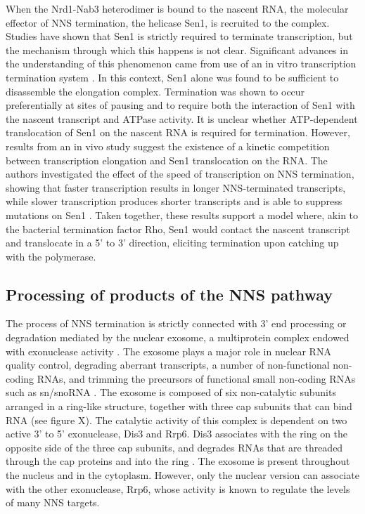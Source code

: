 When the Nrd1-Nab3 heterodimer is bound to the nascent RNA, the molecular effector of NNS termination, the helicase Sen1, is recruited to the complex. 
Studies have shown that Sen1 is strictly required to terminate transcription, but the mechanism through which this happens is not clear. 
Significant advances in the understanding of this phenomenon came from use of an in vitro transcription termination system \cite{porrua:2013:bacteriallike}. 
In this context, Sen1 alone was found to be sufficient to disassemble the elongation complex. Termination was shown to occur preferentially at sites of pausing and to require both the interaction of Sen1 with the nascent transcript and ATPase activity. 
It is unclear whether ATP-dependent translocation of Sen1 on the nascent RNA is required for termination. However, results from an in vivo study suggest the existence of a kinetic competition between transcription elongation and Sen1 translocation on the RNA. 
The authors investigated the effect of the speed of transcription on NNS termination, showing that faster transcription results in longer NNS-terminated transcripts, while slower transcription produces shorter transcripts and is able to suppress mutations on Sen1 \cite{hazelbaker:2013:kinetic}. 
Taken together, these results support a model where, akin to the bacterial termination factor Rho, Sen1 would contact the nascent transcript and translocate in a 5’ to 3’ direction, eliciting termination upon catching up with the polymerase.

\subsection{Processing of products of the NNS pathway}

The process of NNS termination is strictly connected with 3' end processing or degradation mediated by the nuclear exosome, a multiprotein complex endowed with exonuclease activity \cite{vasiljeva:2006:nrd1}. 
The exosome plays a major role in nuclear RNA quality control, degrading aberrant transcripts, a number of non-functional non-coding RNAs, and trimming the precursors of functional small non-coding RNAs such as sn/snoRNA \cite[for review see][]{kilchert:2016:regulation}. 
The exosome is composed of six non-catalytic subunits arranged in a ring-like structure, together with three cap subunits that can bind RNA (see figure X). 
The catalytic activity of this complex is dependent on two active 3' to 5' exonuclease, Dis3 and Rrp6. 
Dis3 associates with the ring on the opposite side of the three cap subunits, and degrades RNAs that are threaded through the cap proteins and into the ring \cite{makino:2015:rna}. 
The exosome is present throughout the nucleus and in the cytoplasm. 
However, only the nuclear version can associate with the other exonuclease, Rrp6, whose activity is known to regulate the levels of many NNS targets.

